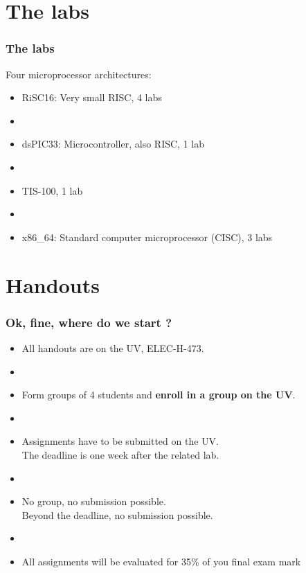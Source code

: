 \documentclass[11pt,a4paper,compress]{beamer}%
\begin{document}
\section{The labs}
\begin{frame}
\frametitle{The labs}

Four microprocessor architectures:
\begin{itemize}
\item RiSC16: Very small RISC, 4 labs
\item[]
\item dsPIC33: Microcontroller, also RISC, 1 lab
\item[]
\item TIS-100, 1 lab
\item[]
\item x86\_64: Standard computer microprocessor (CISC), 3 labs
\end{itemize}
\end{frame}

\section{Handouts}
\begin{frame}
\frametitle{Ok, fine, where do we start ?}
\begin{itemize}
\item All handouts are on the UV, ELEC-H-473.
\item[]
\item Form groups of 4 students and \textbf{enroll in a group on the UV}.
\item[]
\item Assignments have to be submitted on the UV.\\ The deadline is one week after the related lab.
\item[]
\item No group, no submission possible.\\Beyond the deadline, no submission possible.
\item[]
\item All assignments will be evaluated for 35\% of you final exam mark
\end{itemize}


\end{frame}
\end{document}
